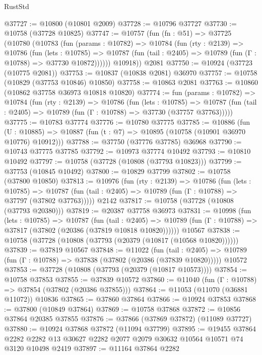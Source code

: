 \begin{lexlean}{RustStd}
\begin{coremodule}
@37727 := @10800 (@10801 @2009)
@37728 := @10796 @37727
@37730 := @10758 (@37728 @10825)
@37747 := @10757
    (fun (fn : @51) =>
    @37725
      (@10780
        (@10783
          (fun (params : @10782) =>
          @10784
            (fun (rty : @2139) =>
            @10786
              (fun (lets : @10785) =>
              @10787 (fun (tail : @2405) => @10789 (fun (Γ : @10788) => @37730 @10872))))))
        @10918))
    @2081
@37750 := @10924 (@37723 (@10775 @2081))
@37753 := @10837 (@10838 @2081) @36970
@37757 := @10758 (@10829 (@37753 @10846) @10850)
@37758 := @10863 @2081
@37763 := @10860 (@10862 @37758 @36973 @10818 @10820)
@37774 := fun (params : @10782) =>
  @10784
    (fun (rty : @2139) =>
    @10786
      (fun (lets : @10785) =>
      @10787 (fun (tail : @2405) => @10789 (fun (Γ : @10788) => @37730 (@37757 @37763)))))
@37775 := @10783 @37774
@37776 := @10780 @37775
@37785 := @10886
    (fun (U : @10885) => @10887 (fun (t : @7) => @10895 (@10758 (@10901 @36970 @10776) @10912)))
@37788 := @37750 (@37776 @37785) @36968
@37790 := @10743 @37775 @37785
@37792 := @10973 @37774 @10492
@37793 := @10810 @10492
@37797 := @10758 (@37728 (@10808 (@37793 @10823)))
@37799 := @37753 (@10845 @10492)
@37800 := @10829 @37799
@37802 := @10758 (@37800 @10850)
@37813 := @10976
    (fun (rty : @2139) =>
    @10786
      (fun (lets : @10785) =>
      @10787 (fun (tail : @2405) => @10789 (fun (Γ : @10788) => @37797 (@37802 @37763)))))
    @2142
@37817 := @10758 (@37728 (@10808 (@37793 @20380)))
@37819 := @20387 @37758 @36973
@37831 := @10998
    (fun (lets : @10785) =>
    @10787
      (fun (tail : @2405) =>
      @10789 (fun (Γ : @10788) => @37817 (@37802 (@20386 (@37819 @10818 @10820))))))
    @10567
@37838 := @10758 (@37728 (@10808 (@37793 (@20379 (@10817 (@10568 @10820))))))
@37839 := @37819 @10567
@37848 := @11022
    (fun (tail : @2405) => @10789 (fun (Γ : @10788) => @37838 (@37802 (@20386 (@37839 @10820)))))
    @10572
@37853 := @37728 (@10808 (@37793 (@20379 (@10817 @10573))))
@37854 := @10758 @37853
@37855 := @37839 @10572
@37860 := @11040 (fun (Γ : @10788) => @37854 (@37802 (@20386 @37855)))
@37864 := @11053 (@11070 (@36881 @11072)) @10836
@37865 := @37860 @37864
@37866 := @10924 @37853
@37868 := @37800 (@10849 @37864)
@37869 := @10758 @37868
@37872 := @10856 @37864 @20385 @37855
@37876 := @37866 (@37869 @37872) (@11089 @37727)
@37880 := @10924 @37868 @37872 (@11094 @37799)
@37895 := @19455
    @37864
    @2282
    @2282
    @13
    @30627
    @2282
    @2077
    @2079
    @30632
    @10564
    @10571
    @74
    @3120
    @10498
    @2419
@37897 := @11164 @37864 @2282

\end{coremodule}
\end{lexlean}
